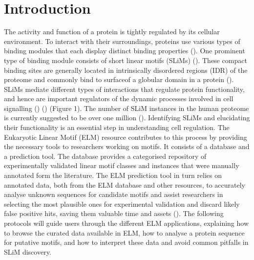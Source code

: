 \section*{Introduction}\label{sec:introduction}

The activity and function of a protein is tightly regulated by its
cellular environment. To interact with their surroundings, proteins use
various types of binding modules that each display distinct binding
properties (\cite{10550212}). One prominent type of binding module
consists of short linear motifs (SLiMs) (\cite{18508681}). These compact
binding sites are generally located in intrinsically disordered regions
(IDR) of the proteome and commonly bind to
surfaceof a globular domain in a protein (\cite{21909575}). SLiMs mediate
different types of interactions that regulate protein functionality, and hence
are important regulators of the dynamic processes involved in cell
signalling (\cite{22480932}) (\cite{24926813}) (Figure 1). The number of
SLiM instances in the human proteome is currently suggested to be over
one million (\cite{25038412}). Identifying SLiMs and elucidating their
functionality is an essential step in understanding cell regulation. The
Eukaryotic Linear Motif (ELM) resource contributes to this process by
providing the necessary tools to researchers working on motifs. It
consists of a database and a prediction tool. The database provides a
categorised repository of experimentally validated linear motif classes
and instances that were manually annotated form the literature. The ELM
prediction tool in turn relies on annotated data, both from the ELM
database and other resources, to accurately analyse unknown sequences
for candidate motifs and assist researchers in selecting the most
plausible ones for experimental validation and discard likely false
positive hits, saving them valuable time and assets (\cite{22110040}).
The following protocols will guide users through the different ELM
applications, explaining how to browse the curated data available in
ELM, how to analyse a protein sequence for putative motifs, and how to
interpret these data and avoid common pitfalls in SLiM discovery.

